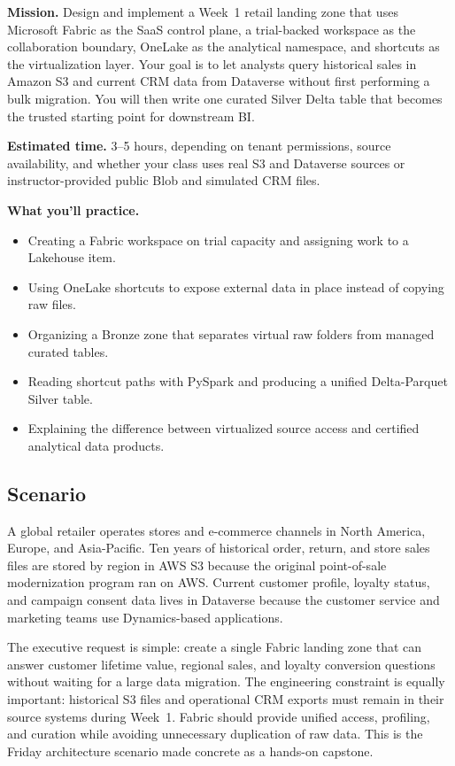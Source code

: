 \begin{capstonebox}
\textbf{Mission.} Design and implement a Week~1 retail landing zone that uses Microsoft Fabric as the SaaS control plane, a trial-backed workspace as the collaboration boundary, OneLake as the analytical namespace, and shortcuts as the virtualization layer. Your goal is to let analysts query historical sales in Amazon S3 and current CRM data from Dataverse without first performing a bulk migration. You will then write one curated Silver Delta table that becomes the trusted starting point for downstream BI.

\textbf{Estimated time.} 3--5 hours, depending on tenant permissions, source availability, and whether your class uses real S3 and Dataverse sources or instructor-provided public Blob and simulated CRM files.

\textbf{What you'll practice.}
\begin{itemize}
    \item Creating a Fabric workspace on trial capacity and assigning work to a Lakehouse item.
    \item Using OneLake shortcuts to expose external data in place instead of copying raw files.
    \item Organizing a Bronze zone that separates virtual raw folders from managed curated tables.
    \item Reading shortcut paths with PySpark and producing a unified Delta-Parquet Silver table.
    \item Explaining the difference between virtualized source access and certified analytical data products.
\end{itemize}
\end{capstonebox}

\subsection*{Scenario}
A global retailer operates stores and e-commerce channels in North America, Europe, and Asia-Pacific. Ten years of historical order, return, and store sales files are stored by region in AWS S3 because the original point-of-sale modernization program ran on AWS. Current customer profile, loyalty status, and campaign consent data lives in Dataverse because the customer service and marketing teams use Dynamics-based applications.

The executive request is simple: create a single Fabric landing zone that can answer customer lifetime value, regional sales, and loyalty conversion questions without waiting for a large data migration. The engineering constraint is equally important: historical S3 files and operational CRM exports must remain in their source systems during Week~1. Fabric should provide unified access, profiling, and curation while avoiding unnecessary duplication of raw data. This is the Friday architecture scenario made concrete as a hands-on capstone.


